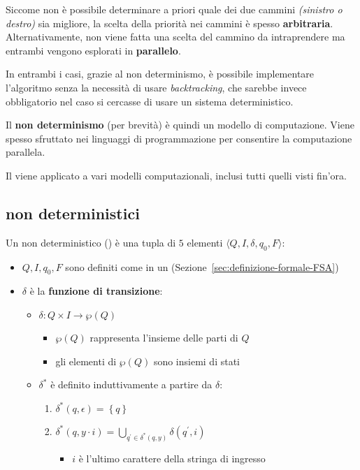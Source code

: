 \documentclass[italian, 10pt]{article}
\begin{document}
Siccome non è possibile determinare a priori quale dei due cammini \textit{(sinistro o destro)} sia migliore, la scelta della priorità nei cammini è spesso \textbf{arbitraria}.
Alternativamente, non viene fatta una scelta del cammino da intraprendere ma entrambi vengono esplorati in \textbf{parallelo}.

In entrambi i casi, grazie al non determinismo, è possibile implementare l'algoritmo senza la necessità di usare \textit{backtracking}, che sarebbe invece obbligatorio nel caso si cercasse di usare un sistema deterministico.

\bigskip
Il \textbf{non determinismo} (\ND per brevità) è quindi un modello di computazione.
Viene spesso sfruttato nei linguaggi di programmazione per consentire la computazione parallela.

Il \ND viene applicato a vari modelli computazionali, inclusi tutti quelli visti fin'ora.

\subsection{\FSA non deterministici}
\label{sec:FSA-non-deterministici}

Un \FSA non deterministico (\NFA) è una tupla di \(5\) elementi \(\langle Q, I, \delta, q_0, F \rangle\):

\begin{itemize}
  \item \(Q, I, q_0, F\) sono definiti come in un \FSA (Sezione~\ref{sec:definizione-formale-FSA})
  \item \(\delta\) è la \textbf{funzione di transizione}:
        \begin{itemize}
          \item \(\delta: Q \times I \rightarrow \wp(Q)\)
                \begin{itemize}[label=\(\rightarrow\)]
                  \item \(\wp(Q)\) rappresenta l'insieme delle parti di \(Q\)
                  \item gli elementi di \(\wp(Q)\) sono insiemi di stati
                \end{itemize}
          \item \(\delta^\ast\) è definito induttivamente a partire da \(\delta\):
                \begin{enumerate}
                  \item \(\delta^\ast(q, \epsilon) = \left\{q\right\}\)
                  \item \(\displaystyle \delta^\ast(q, y \cdot i) = \bigcup_{q^\prime \in \delta^\ast (q, y)} \delta (q^\prime, i)\)
                        \begin{itemize}[label=\(\rightarrow\)]
                          \item \(i\) è l'ultimo carattere della stringa di ingresso
                        \end{itemize}
                \end{enumerate}
        \end{itemize}
\end{itemize}
\end{document}
